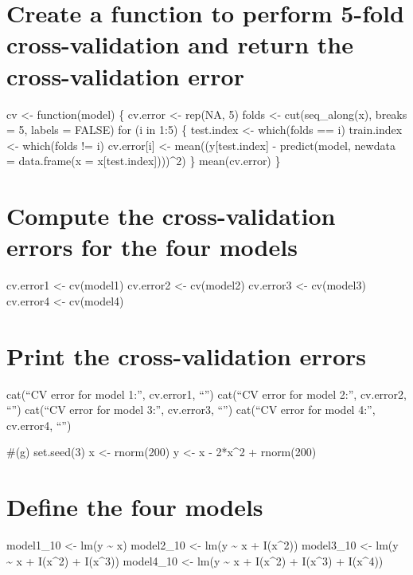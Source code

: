 \documentclass[
]{article}
\begin{document}
\hypertarget{create-a-function-to-perform-5-fold-cross-validation-and-return-the-cross-validation-error}{%
\section{Create a function to perform 5-fold cross-validation and return
the cross-validation
error}\label{create-a-function-to-perform-5-fold-cross-validation-and-return-the-cross-validation-error}}

cv \textless- function(model) \{ cv.error \textless- rep(NA, 5) folds
\textless- cut(seq\_along(x), breaks = 5, labels = FALSE) for (i in 1:5)
\{ test.index \textless- which(folds == i) train.index \textless-
which(folds != i) cv.error{[}i{]} \textless- mean((y{[}test.index{]} -
predict(model, newdata = data.frame(x = x{[}test.index{]})))\^{}2) \}
mean(cv.error) \}

\hypertarget{compute-the-cross-validation-errors-for-the-four-models}{%
\section{Compute the cross-validation errors for the four
models}\label{compute-the-cross-validation-errors-for-the-four-models}}

cv.error1 \textless- cv(model1) cv.error2 \textless- cv(model2)
cv.error3 \textless- cv(model3) cv.error4 \textless- cv(model4)

\hypertarget{print-the-cross-validation-errors}{%
\section{Print the cross-validation
errors}\label{print-the-cross-validation-errors}}

cat(``CV error for model 1:'', cv.error1, ``\n'') cat(``CV error for
model 2:'', cv.error2, ``\n'') cat(``CV error for model 3:'', cv.error3,
``\n'') cat(``CV error for model 4:'', cv.error4, ``\n'')

\#(g) set.seed(3) x \textless- rnorm(200) y \textless- x - 2*x\^{}2 +
rnorm(200)

\hypertarget{define-the-four-models-1}{%
\section{Define the four models}\label{define-the-four-models-1}}

model1\_10 \textless- lm(y \textasciitilde{} x) model2\_10 \textless-
lm(y \textasciitilde{} x + I(x\^{}2)) model3\_10 \textless- lm(y
\textasciitilde{} x + I(x\^{}2) + I(x\^{}3)) model4\_10 \textless- lm(y
\textasciitilde{} x + I(x\^{}2) + I(x\^{}3) + I(x\^{}4))
\end{document}
